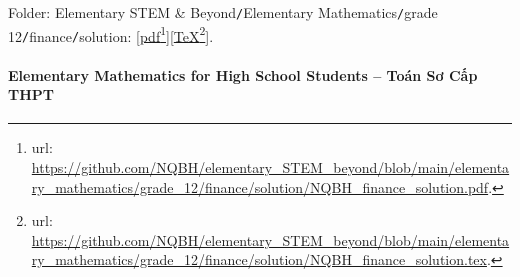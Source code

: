 \documentclass[12pt]{article}
\begin{document}
\begin{enumerate}
\begin{itemize}
		Folder: {\sf Elementary STEM \& Beyond{\tt/}Elementary Mathematics{\tt/}grade 12{\tt/}finance{\tt/}solution}: [\href{https://github.com/NQBH/elementary_STEM_beyond/blob/main/elementary_mathematics/grade_12/finance/solution/NQBH_finance_solution.pdf}{pdf}\footnote{{\sc url}: \url{https://github.com/NQBH/elementary_STEM_beyond/blob/main/elementary_mathematics/grade_12/finance/solution/NQBH_finance_solution.pdf}.}][\href{https://github.com/NQBH/elementary_STEM_beyond/blob/main/elementary_mathematics/grade_12/finance/solution/NQBH_finance_solution.tex}{\TeX}\footnote{{\sc url}: \url{https://github.com/NQBH/elementary_STEM_beyond/blob/main/elementary_mathematics/grade_12/finance/solution/NQBH_finance_solution.tex}.}].
	\end{itemize}
\end{enumerate}

\paragraph{Elementary Mathematics for High School Students -- Toán Sơ Cấp THPT}
\end{document}
